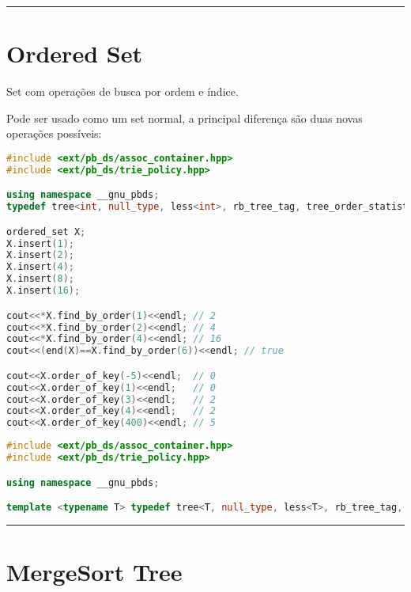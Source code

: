\documentclass[11pt, a4paper, twoside]{book}
\begin{document}
\hfill

\rule{\textwidth}{0.4pt}

\section{Ordered Set}



Set com operações de busca por ordem e índice.



Pode ser usado como um set normal, a principal diferença são duas novas operações possíveis:





\textbf{} 
\begin{lstlisting}[language=C++]
#include <ext/pb_ds/assoc_container.hpp>
#include <ext/pb_ds/trie_policy.hpp>

using namespace __gnu_pbds;
typedef tree<int, null_type, less<int>, rb_tree_tag, tree_order_statistics_node_update> ordered_set;

ordered_set X;
X.insert(1);
X.insert(2);
X.insert(4);
X.insert(8);
X.insert(16);

cout<<*X.find_by_order(1)<<endl; // 2
cout<<*X.find_by_order(2)<<endl; // 4
cout<<*X.find_by_order(4)<<endl; // 16
cout<<(end(X)==X.find_by_order(6))<<endl; // true

cout<<X.order_of_key(-5)<<endl;  // 0
cout<<X.order_of_key(1)<<endl;   // 0
cout<<X.order_of_key(3)<<endl;   // 2
cout<<X.order_of_key(4)<<endl;   // 2
cout<<X.order_of_key(400)<<endl; // 5

\end{lstlisting}


\hfill

\begin{lstlisting}[language=C++]
#include <ext/pb_ds/assoc_container.hpp>
#include <ext/pb_ds/trie_policy.hpp>

using namespace __gnu_pbds;

template <typename T> typedef tree<T, null_type, less<T>, rb_tree_tag, tree_order_statistics_node_update> ordered_set;\end{lstlisting}

\hfill

\rule{\textwidth}{0.4pt}

\section{MergeSort Tree}
\end{document}
